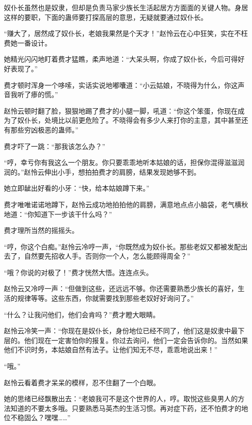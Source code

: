 
\begin{this_body}



奴仆长虽然也是奴隶，但却是负责马家少族长生活起居方方面面的关键人物。身居这样的要职，下面的蛊师要打探高层的意思，无疑就要通过奴仆长。

“赚大了，居然成了奴仆长，老娘我果然是个天才！”赵怜云在心中狂笑，实在不枉费她一番设计。

她精光闪闪地盯着费才猛瞧，柔声地道：“大呆头啊，你成了奴仆长，今后可得好好表现了。”

费才顿时浑身一个哆嗦，实话实说地嘟囔道：“小云姑娘，不晓得为什么，你这声音我听了瘆的慌。”

赵怜云顿时翻了脸，狠狠地踢了费才的小腿一脚，吼道：“你这个笨蛋，你现在成为了奴仆长，处境比以前更危险了。不晓得会有多少人来打你的主意，其中甚至还有那些穷凶极恶的蛊师。”

费才吓了一跳：“那我该怎么办？”

“哼，幸亏你有我这么一个朋友。你只要乖乖地听本姑娘的话，担保你混得滋滋润润的。”赵怜云伸出小手，想拍拍费才的肩膀，结果发现她够不到。

她立即龇出好看的小牙：“快，给本姑娘蹲下来。”

费才唯唯诺诺地蹲下，赵怜云成功地拍拍他的肩膀，满意地点点小脑袋，老气横秋地道：“你知道下一步该干什么吗？”

费才理所当然的摇摇头。

“哼，你这个白痴。”赵怜云冷哼一声，“你既然成为奴仆长。那些老奴又都被发配出去了，自然要先招收人手。否则你一个人，怎么能顾得周全？”

“哦？你说的对极了！”费才恍然大悟。连连点头。

赵怜云又冷哼一声：“但做到这些，还远远不够。你还需要熟悉少族长的喜好，生活的规律等等。这些东西，你就需要找到那些老奴好好询问了。”

“什么？让我问他们，他们会肯吗？”费才瞪大眼睛。

赵怜云冷笑一声：“你现在是奴仆长，身份地位已经不同了，他们这是奴隶中最下层的。他们现在一定害怕你的报复。你过去询问，他们一定会告诉你的。当然如果他们不识时务，本姑娘自然有法子。让他们知无不尽，乖乖地说出来！”

“哦。”

赵怜云看着费才呆呆的模样，忍不住翻了一个白眼。

她的思绪已经飘散出去：“老娘我可不是这个世界的人，哼。取悦这些臭男人的方法知道的不要太多哦。只要熟悉马英杰的生活习惯。再对症下药，还不怕费才的地位不稳固么？嘿嘿……”


\end{this_body}
